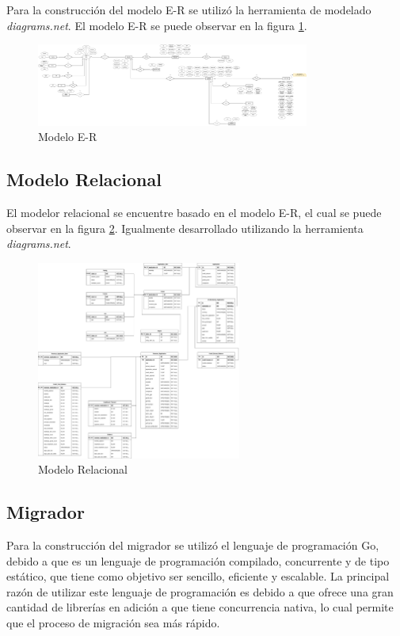 Para la construcción del modelo E-R se utilizó la herramienta de modelado
\textit{diagrams.net}. El modelo E-R se puede observar en la figura
\ref{fig:er-diagram}.

\begin{figure}[H]
    \centering
    \includegraphics[width=0.8\textwidth]{img/er-diagram.png}
    \caption{Modelo E-R}
    \label{fig:er-diagram}
\end{figure}

\subsection{Modelo Relacional}

El modelor relacional se encuentre basado en el modelo E-R, el cual se puede
observar en la figura \ref{fig:relational-model}. Igualmente desarrollado 
utilizando la herramienta \textit{diagrams.net}.

\begin{figure}[H]
    \centering
    \includegraphics[width=0.6\textwidth]{img/relational-diagram.png}
    \caption{Modelo Relacional}
    \label{fig:relational-model}
\end{figure}

\subsection{Migrador}

Para la construcción del migrador se utilizó el lenguaje de programación Go,
debido a que es un lenguaje de programación compilado, concurrente y de tipo
estático, que tiene como objetivo ser sencillo, eficiente y escalable. La 
principal razón de utilizar este lenguaje de programación es debido a que
ofrece una gran cantidad de librerías en adición a que tiene concurrencia 
nativa, lo cual permite que el proceso de migración sea más rápido.

